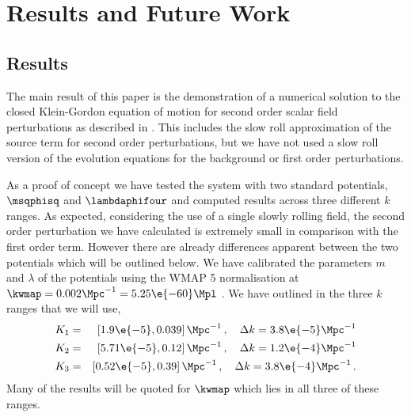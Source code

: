 \renewcommand{\CVSrevision}{\version$Id:results.tex,v 1.0 2009/09/29 10:40:20
ith Exp  $}

\chapter{Results and Future Work}
\label{ch:results}


\section{Results}
\label{sec:results}


The main result of this paper is the demonstration of a numerical solution to
the closed Klein-Gordon equation of motion for second order scalar field
perturbations as described in . This includes the slow
roll approximation of the source term for second order perturbations, but we
have not used a slow
roll version of the evolution equations for the background or first order
perturbations. 

As a proof of concept we have tested the system with two standard potentials,
$\msqphisq$ and $\lambdaphifour$ and computed results across three
different $k$ ranges. As expected, considering the use of a single slowly
rolling field, the second order perturbation we have calculated is extremely
small in comparison with the first order term. However there are already
differences apparent between the two potentials which will be outlined below.
We have calibrated the parameters $m$ and $\lambda$ of the potentials using the
WMAP 5 normalisation at $\kwmap=0.002 \Mpc^{-1} = 5.25 \e{-60}\Mpl$
\cite{Komatsu:2008hk}.
We have outlined in  the three $k$ ranges that we will use,
% 
\begin{eqnarray*}
K_1 &=& \left[1.9\e{-5}, 0.039\right]\Mpc^{-1}\,,\quad \Delta k =
3.8\e{-5}\Mpc^{-1} \nonumber\\
K_2 &=& \left[5.71\e{-5}, 0.12\right]\Mpc^{-1}\,, \quad \Delta k =
1.2\e{-4}\Mpc^{-1}
\nonumber\\ 
K_3 &=& \left[0.52\e{-5}, 0.39\right]\Mpc^{-1}\,, \quad \Delta k =
3.8\e{-4}\Mpc^{-1} \,.
\end{eqnarray*}
Many of the results will be quoted for $\kwmap$ which lies in all three of these
ranges.

